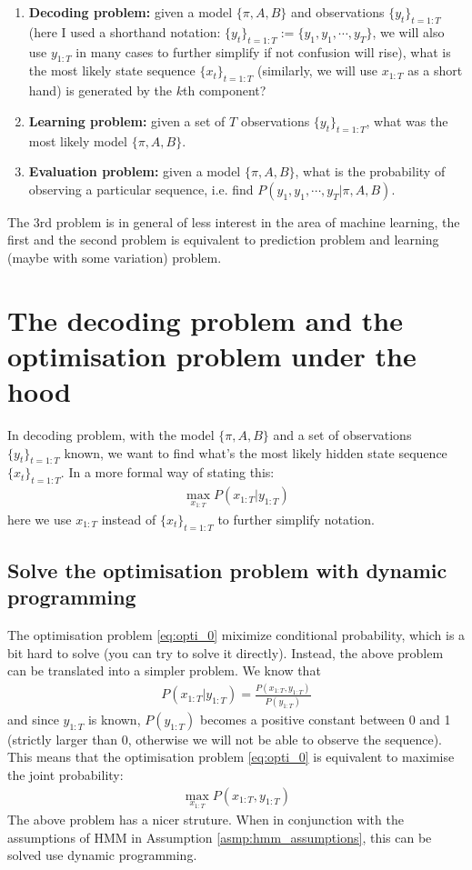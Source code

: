 \documentclass{article} [10pt] %
\begin{document}
\begin{enumerate}
	\item\textbf{Decoding problem:} given a model $\{\pi, A, B\}$ and observations $\{y_t\}_{t=1:T}$ (here I used a shorthand notation: $\{y_t\}_{t=1:T}:=\{y_1, y_1, \cdots, y_T\}$, we will also use $y_{1:T}$ in many cases to further simplify if not confusion will rise), what is the most likely state sequence $\{x_t\}_{t=1:T}$ (similarly, we will use $x_{1:T}$ as a short hand) is generated by the $k$th component?
	\item\textbf{Learning problem:} given a set of $T$ observations $\{y_t\}_{t=1:T}$, what was the most likely model $\{\pi, A, B\}$.
	\item\textbf{Evaluation problem:}  given a model $\{\pi, A, B\}$, what is the probability of observing a particular sequence, i.e. find $P(y_1,y_1,\cdots,y_T|\pi, A, B)$.
\end{enumerate}
The 3rd problem is in general of less interest in the area of machine learning, the first and the second problem is equivalent to prediction problem and learning (maybe with some variation) problem.


\section{The decoding problem and the optimisation problem under the hood}
In decoding problem, with the model $\{\pi, A, B\}$ and a set of observations $\{y_t\}_{t=1:T}$ known, we want to find what's the most likely hidden state sequence $\{x_t\}_{t=1:T}$. In a more formal way of stating this:
\begin{align} \label{eq:opti_0}
	\max_{x_{1:T}} P(x_{1:T} | y_{1:T})
\end{align}
here we use $x_{1:T}$ instead of $\{x_t\}_{t=1:T}$ to further simplify notation. 

\subsection{Solve the optimisation problem with dynamic programming}
The optimisation problem \eqref{eq:opti_0} miximize conditional probability, which is a bit hard to solve (you can try to solve it directly). Instead, the above problem can be translated into a simpler problem. We know that 
\begin{align}
	P(x_{1:T} | y_{1:T}) = \frac{P(x_{1:T}, y_{1:T})}{P( y_{1:T})}
\end{align}
and since $y_{1:T}$ is known, $P( y_{1:T})$ becomes a positive constant between 0 and 1 (strictly larger than 0, otherwise we will not be able to observe the sequence). This means that the optimisation problem \eqref{eq:opti_0} is equivalent to maximise the joint probability:
 \begin{align}
	\max_{x_{1:T}} P(x_{1:T},  y_{1:T})
\end{align}
The above problem has a nicer struture. When in conjunction with the assumptions of HMM in Assumption \ref{asmp:hmm_assumptions}, this can be solved use dynamic programming.
\end{document}
